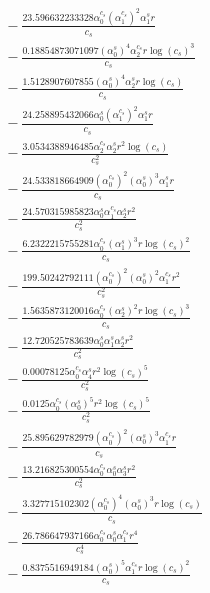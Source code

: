 \documentclass[10pt]{article}
\begin{document}
\begin{align*}
&{}  - \frac{23.596632233328 \alpha_{0}^{c_s} \left(\alpha_{1}^{c_s}\right)^{2} \alpha_{1}^s r}{c_{s}} \\
&{}  - \frac{0.18854873071097 \left(\alpha_{0}^s\right)^{4} \alpha_{2}^{c_s} r \log{\left(c_{s} \right)}^{3}}{c_{s}} \\
&{}  - \frac{1.5128907607855 \left(\alpha_{0}^s\right)^{4} \alpha_{2}^s r \log{\left(c_{s} \right)}}{c_{s}} \\
&{}  - \frac{24.258895432066 \alpha_{0}^s \left(\alpha_{1}^{c_s}\right)^{2} \alpha_{1}^s r}{c_{s}} \\
&{}  - \frac{3.0534388946485 \alpha_{2}^{c_s} \alpha_{2}^s r^{2} \log{\left(c_{s} \right)}}{c_{s}^{2}} \\
&{}  - \frac{24.533818664909 \left(\alpha_{0}^{c_s}\right)^{2} \left(\alpha_{0}^s\right)^{3} \alpha_{1}^s r}{c_{s}} \\
&{}  - \frac{24.570315985823 \alpha_{0}^s \alpha_{1}^{c_s} \alpha_{2}^s r^{2}}{c_{s}^{2}} \\
&{}  - \frac{6.2322215755281 \alpha_{0}^{c_s} \left(\alpha_{1}^s\right)^{3} r \log{\left(c_{s} \right)}^{2}}{c_{s}} \\
&{}  - \frac{199.50242792111 \left(\alpha_{0}^{c_s}\right)^{2} \left(\alpha_{0}^s\right)^{2} \alpha_{1}^{c_s} r^{2}}{c_{s}^{2}} \\
&{}  - \frac{1.5635873120016 \alpha_{0}^{c_s} \left(\alpha_{2}^s\right)^{2} r \log{\left(c_{s} \right)}^{3}}{c_{s}} \\
&{}  - \frac{12.720525783639 \alpha_{0}^s \alpha_{1}^s \alpha_{2}^s r^{2}}{c_{s}^{2}} \\
&{}  - \frac{0.00078125 \alpha_{0}^{c_s} \alpha_{4}^s r^{2} \log{\left(c_{s} \right)}^{5}}{c_{s}^{2}} \\
&{}  - \frac{0.0125 \alpha_{0}^{c_s} \left(\alpha_{0}^s\right)^{5} r^{2} \log{\left(c_{s} \right)}^{5}}{c_{s}^{2}} \\
&{}  - \frac{25.895629782979 \left(\alpha_{0}^{c_s}\right)^{2} \left(\alpha_{0}^s\right)^{3} \alpha_{1}^{c_s} r}{c_{s}} \\
&{}  - \frac{13.216825300554 \alpha_{0}^{c_s} \alpha_{0}^s \alpha_{3}^s r^{2}}{c_{s}^{2}} \\
&{}  - \frac{3.327715102302 \left(\alpha_{0}^{c_s}\right)^{4} \left(\alpha_{0}^s\right)^{3} r \log{\left(c_{s} \right)}}{c_{s}} \\
&{}  - \frac{26.786647937166 \alpha_{0}^{c_s} \alpha_{0}^s \alpha_{1}^{c_s} r^{4}}{c_{s}^{4}} \\
&{}  - \frac{0.8375516949184 \left(\alpha_{0}^s\right)^{5} \alpha_{1}^{c_s} r \log{\left(c_{s} \right)}^{2}}{c_{s}} \\

\end{align*}
\end{document}
